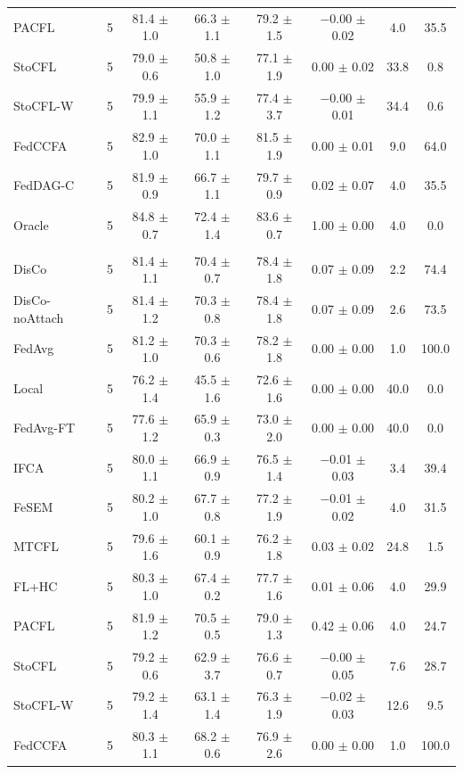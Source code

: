 {{\begin{tabular}{l r c c c c c c}
PACFL & 5 & 81.4 $\pm$ 1.0 & 66.3 $\pm$ 1.1 & 79.2 $\pm$ 1.5 & $-$0.00 $\pm$ 0.02 & 4.0 & 35.5 \\
StoCFL & 5 & 79.0 $\pm$ 0.6 & 50.8 $\pm$ 1.0 & 77.1 $\pm$ 1.9 & 0.00 $\pm$ 0.02 & 33.8 & 0.8 \\
StoCFL-W & 5 & 79.9 $\pm$ 1.1 & 55.9 $\pm$ 1.2 & 77.4 $\pm$ 3.7 & $-$0.00 $\pm$ 0.01 & 34.4 & 0.6 \\
FedCCFA & 5 & 82.9 $\pm$ 1.0 & 70.0 $\pm$ 1.1 & 81.5 $\pm$ 1.9 & 0.00 $\pm$ 0.01 & 9.0 & 64.0 \\
FedDAG-C & 5 & 81.9 $\pm$ 0.9 & 66.7 $\pm$ 1.1 & 79.7 $\pm$ 0.9 & 0.02 $\pm$ 0.07 & 4.0 & 35.5 \\
Oracle & 5 & 84.8 $\pm$ 0.7 & 72.4 $\pm$ 1.4 & 83.6 $\pm$ 0.7 & 1.00 $\pm$ 0.00 & 4.0 & 0.0 \\
\addlinespace
\multicolumn{8}{l}{\textit{CIFAR-10 (ResNet) rotation}} \\
DisCo & 5 & 81.4 $\pm$ 1.1 & 70.4 $\pm$ 0.7 & 78.4 $\pm$ 1.8 & 0.07 $\pm$ 0.09 & 2.2 & 74.4 \\
DisCo-noAttach & 5 & 81.4 $\pm$ 1.2 & 70.3 $\pm$ 0.8 & 78.4 $\pm$ 1.8 & 0.07 $\pm$ 0.09 & 2.6 & 73.5 \\
FedAvg & 5 & 81.2 $\pm$ 1.0 & 70.3 $\pm$ 0.6 & 78.2 $\pm$ 1.8 & 0.00 $\pm$ 0.00 & 1.0 & 100.0 \\
Local & 5 & 76.2 $\pm$ 1.4 & 45.5 $\pm$ 1.6 & 72.6 $\pm$ 1.6 & 0.00 $\pm$ 0.00 & 40.0 & 0.0 \\
FedAvg-FT & 5 & 77.6 $\pm$ 1.2 & 65.9 $\pm$ 0.3 & 73.0 $\pm$ 2.0 & 0.00 $\pm$ 0.00 & 40.0 & 0.0 \\
IFCA & 5 & 80.0 $\pm$ 1.1 & 66.9 $\pm$ 0.9 & 76.5 $\pm$ 1.4 & $-$0.01 $\pm$ 0.03 & 3.4 & 39.4 \\
FeSEM & 5 & 80.2 $\pm$ 1.0 & 67.7 $\pm$ 0.8 & 77.2 $\pm$ 1.9 & $-$0.01 $\pm$ 0.02 & 4.0 & 31.5 \\
MTCFL & 5 & 79.6 $\pm$ 1.6 & 60.1 $\pm$ 0.9 & 76.2 $\pm$ 1.8 & 0.03 $\pm$ 0.02 & 24.8 & 1.5 \\
FL+HC & 5 & 80.3 $\pm$ 1.0 & 67.4 $\pm$ 0.2 & 77.7 $\pm$ 1.6 & 0.01 $\pm$ 0.06 & 4.0 & 29.9 \\
PACFL & 5 & 81.9 $\pm$ 1.2 & 70.5 $\pm$ 0.5 & 79.0 $\pm$ 1.3 & 0.42 $\pm$ 0.06 & 4.0 & 24.7 \\
StoCFL & 5 & 79.2 $\pm$ 0.6 & 62.9 $\pm$ 3.7 & 76.6 $\pm$ 0.7 & $-$0.00 $\pm$ 0.05 & 7.6 & 28.7 \\
StoCFL-W & 5 & 79.2 $\pm$ 1.4 & 63.1 $\pm$ 1.4 & 76.3 $\pm$ 1.9 & $-$0.02 $\pm$ 0.03 & 12.6 & 9.5 \\
FedCCFA & 5 & 80.3 $\pm$ 1.1 & 68.2 $\pm$ 0.6 & 76.9 $\pm$ 2.6 & 0.00 $\pm$ 0.00 & 1.0 & 100.0 \\

\end{tabular}}}
